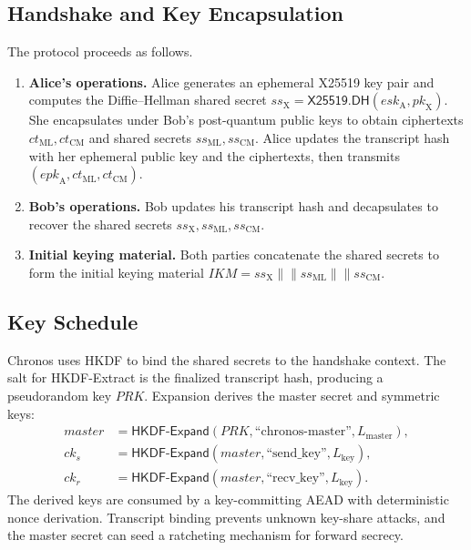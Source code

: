 \documentclass[runningheads]{llncs}
\begin{document}
\subsection{Handshake and Key Encapsulation}
The protocol proceeds as follows.
\begin{enumerate}
  \item \textbf{Alice's operations.}
  Alice generates an ephemeral X25519 key pair and computes the Diffie--Hellman shared secret \(ss_\mathrm{X} = \textsf{X25519.DH}(\mathit{esk}_\mathrm{A}, \mathit{pk}_\mathrm{X})\). She encapsulates under Bob's post-quantum public keys to obtain ciphertexts \(ct_\mathrm{ML}, ct_\mathrm{CM}\) and shared secrets \(ss_\mathrm{ML}, ss_\mathrm{CM}\). Alice updates the transcript hash with her ephemeral public key and the ciphertexts, then transmits \((\mathit{epk}_\mathrm{A}, ct_\mathrm{ML}, ct_\mathrm{CM})\).
  \item \textbf{Bob's operations.}
  Bob updates his transcript hash and decapsulates to recover the shared secrets \(ss_\mathrm{X}, ss_\mathrm{ML}, ss_\mathrm{CM}\).
  \item \textbf{Initial keying material.}
  Both parties concatenate the shared secrets to form the initial keying material \(\mathit{IKM} = ss_\mathrm{X} \|\| ss_\mathrm{ML} \|\| ss_\mathrm{CM}\).
\end{enumerate}

\subsection{Key Schedule}
Chronos uses HKDF to bind the shared secrets to the handshake context. The salt for \textsf{HKDF-Extract} is the finalized transcript hash, producing a pseudorandom key \(\mathit{PRK}\). Expansion derives the master secret and symmetric keys:
\begin{align*}
  \mathit{master} &= \textsf{HKDF-Expand}(\mathit{PRK}, \text{``chronos-master''}, L_\mathrm{master}), \\
  ck_s &= \textsf{HKDF-Expand}(\mathit{master}, \text{``send\_key''}, L_\mathrm{key}), \\
  ck_r &= \textsf{HKDF-Expand}(\mathit{master}, \text{``recv\_key''}, L_\mathrm{key}).
\end{align*}
The derived keys are consumed by a key-committing AEAD with deterministic nonce derivation. Transcript binding prevents unknown key-share attacks, and the master secret can seed a ratcheting mechanism for forward secrecy.
\end{document}
